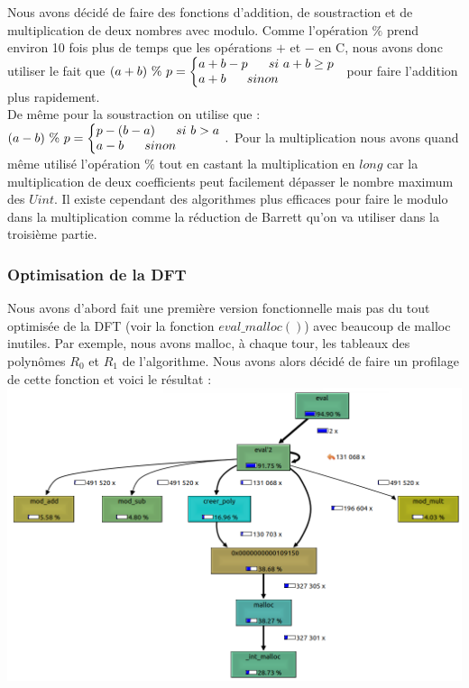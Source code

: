 \documentclass[12pt, a4paper]{article}
\begin{document}
Nous avons décidé de faire des fonctions d'addition, de soustraction et de multiplication de deux nombres avec modulo. Comme l'opération $\%$ prend environ 10 fois plus de temps que les opérations $+$ et $-$ en C, nous avons donc utiliser le fait que 
$ (a+b)\ \%\ p = 
\left\{\begin{array}{@{}l@{}}
a + b - p\ \ \ \ \ si\ a+b \geq p\\
a + b\ \ \ \ \ sinon
\end{array}\right.\,\ $ pour faire l'addition plus rapidement. \\
De même pour la soustraction on utilise que :
$ (a-b)\ \%\ p = 
\left\{\begin{array}{@{}l@{}}
p - (b - a)\ \ \ \ \ si\ b > a\\
a - b\ \ \ \ \ sinon
\end{array}\right.\,.$
Pour la multiplication nous avons quand même utilisé l'opération $\%$ tout en castant la multiplication en $long$ car la multiplication de deux coefficients peut facilement dépasser le nombre maximum des $Uint$. Il existe cependant des algorithmes plus efficaces pour faire le modulo dans la multiplication comme la réduction de Barrett qu'on va utiliser dans la troisième partie.

\subsubsection{Optimisation de la DFT}
Nous avons d'abord fait une première version fonctionnelle mais pas du tout optimisée de la DFT (voir la fonction $eval\_malloc()$) avec beaucoup de malloc inutiles. Par exemple, nous avons malloc, à chaque tour, les tableaux des polynômes $R_0$ et $R_1$ de l'algorithme. Nous avons alors décidé de faire un profilage de cette fonction et voici le résultat :
\includegraphics[scale=0.8]{profiler_eval_malloc}
\end{document}
